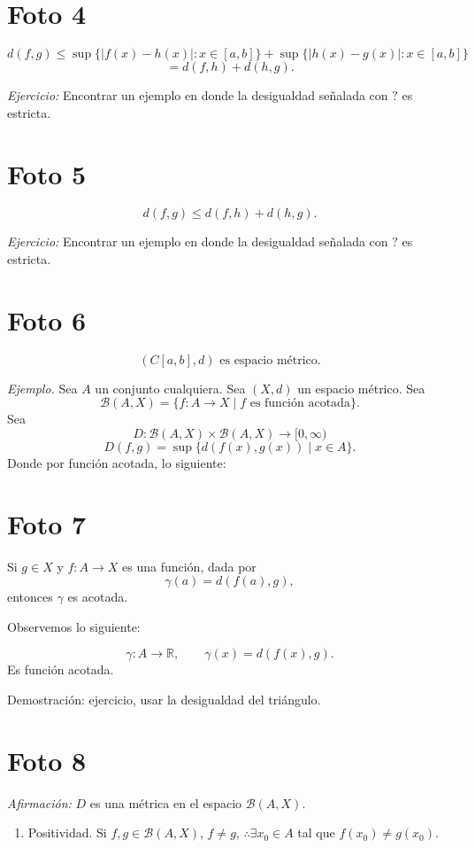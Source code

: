 \documentclass[12pt]{article}
\begin{document}
\section*{Foto 4}

\[
d(f,g)\le \sup\{|f(x)-h(x)|:x\in[a,b]\}+\sup\{|h(x)-g(x)|:x\in[a,b]\}
\]
\[
=d(f,h)+d(h,g).
\]

\textit{Ejercicio:} Encontrar un ejemplo en donde la desigualdad señalada con $?$ es estricta.

\section*{Foto 5}

\[
d(f,g)\le d(f,h)+d(h,g).
\]

\textit{Ejercicio:} Encontrar un ejemplo en donde la desigualdad señalada con $?$ es estricta.

\section*{Foto 6}

\[
(C[a,b],d)\text{ es espacio métrico.}
\]

\textit{Ejemplo.} Sea $A$ un conjunto cualquiera. Sea $(X,d)$ un espacio métrico.
Sea
\[
\mathcal B(A,X)=\{f:A\to X\mid f \text{ es función acotada}\}.
\]
Sea
\[
D:\mathcal B(A,X)\times \mathcal B(A,X)\to [0,\infty)
\]
\[
D(f,g)=\sup\{d(f(x),g(x))\mid x\in A\}.
\]
Donde por función acotada, lo siguiente:

\section*{Foto 7}

Si $g\in X$ y $f:A\to X$ es una función, dada por
\[
\gamma(a)=d(f(a),g),
\]
entonces $\gamma$ es acotada.

Observemos lo siguiente:

\[
\gamma:A\to\mathbb R,
\qquad
\gamma(x)=d(f(x),g).
\]
Es función acotada.

Demostración: ejercicio, usar la desigualdad del triángulo.

\section*{Foto 8}

\textit{Afirmación:} $D$ es una métrica en el espacio $\mathcal B(A,X)$.

\begin{enumerate}[label=\arabic*)]
    \item Positividad. Si $f,g\in\mathcal B(A,X)$, $f\neq g$, $\therefore \exists x_0\in A$ tal que $f(x_0)\neq g(x_0)$.
\end{enumerate}
\end{document}
